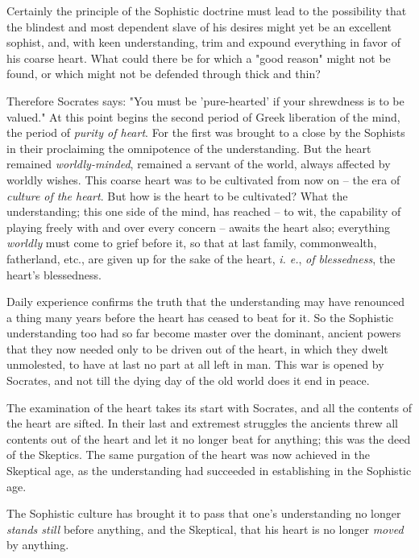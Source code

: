 \documentclass[a4paper]{book}
\begin{document}
Certainly the principle of the Sophistic doctrine must lead to the possibility 
that the blindest and most dependent slave of his desires might yet be an 
excellent sophist, and, with keen understanding, trim and expound everything 
in favor of his coarse heart. What could there be for which a "{}good 
reason"{} might not be found, or which might not be defended through thick and 
thin?

Therefore Socrates says: "{}You must be 'pure-hearted' if your shrewdness is 
to be valued."{} At this point begins the second period of Greek liberation of 
the mind, the period of \textit{purity of heart}. For the first was brought to 
a close by the Sophists in their proclaiming the omnipotence of the 
understanding. But the heart remained \textit{worldly-minded}, remained a 
servant of the world, always affected by worldly wishes. This coarse heart was 
to be cultivated from now on -- the era of \textit{culture of the heart}. But 
how is the heart to be cultivated? What the understanding; this one side of 
the mind, has reached -- to wit, the capability of playing freely with and 
over every concern -- awaits the heart also; everything \textit{worldly} must 
come to grief before it, so that at last family, commonwealth, fatherland, 
etc., are given up for the sake of the heart, \textit{i. e.}, \textit{of 
blessedness}, the heart's blessedness.

Daily experience confirms the truth that the understanding may have renounced 
a thing many years before the heart has ceased to beat for it. So the 
Sophistic understanding too had so far become master over the dominant, 
ancient powers that they now needed only to be driven out of the heart, in 
which they dwelt unmolested, to have at last no part at all left in man. This 
war is opened by Socrates, and not till the dying day of the old world does it 
end in peace.

The examination of the heart takes its start with Socrates, and all the 
contents of the heart are sifted. In their last and extremest struggles the 
ancients threw all contents out of the heart and let it no longer beat for 
anything; this was the deed of the Skeptics. The same purgation of the heart 
was now achieved in the Skeptical age, as the understanding had succeeded in 
establishing in the Sophistic age.

The Sophistic culture has brought it to pass that one's understanding no 
longer \textit{stands still} before anything, and the Skeptical, that his 
heart is no longer \textit{moved} by anything.
\end{document}
